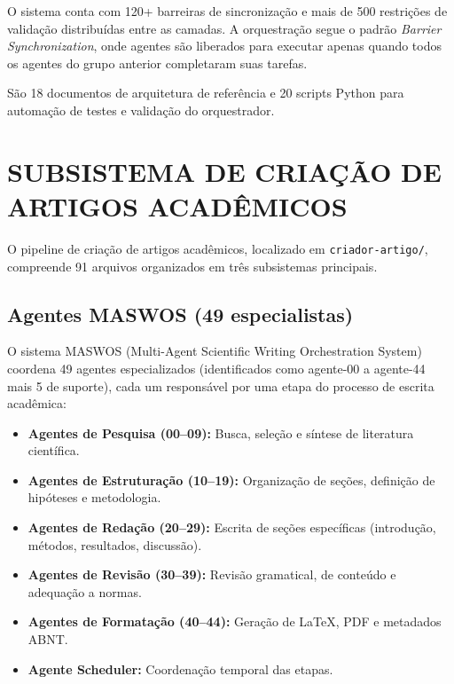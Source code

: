 \documentclass[
  brazil,
  sumario=tradicional,
  10pt
]{abntex2}
\begin{document}
O sistema conta com 120+ barreiras de sincronização e mais de 500
restrições de validação distribuídas entre as camadas. A orquestração
segue o padrão \textit{Barrier Synchronization}, onde agentes são
liberados para executar apenas quando todos os agentes do grupo
anterior completaram suas tarefas.

São 18 documentos de arquitetura de referência e 20 scripts Python
para automação de testes e validação do orquestrador.

\section{SUBSISTEMA DE CRIAÇÃO DE ARTIGOS ACADÊMICOS}
\label{sec:artigo}

O pipeline de criação de artigos acadêmicos, localizado em
\texttt{criador-artigo/}, compreende 91 arquivos organizados em
três subsistemas principais.

\subsection{Agentes MASWOS (49 especialistas)}

O sistema MASWOS (Multi-Agent Scientific Writing Orchestration System)
coordena 49 agentes especializados (identificados como agente-00 a
agente-44 mais 5 de suporte), cada um responsável por uma etapa do
processo de escrita acadêmica:

\begin{itemize}
  \item \textbf{Agentes de Pesquisa (00--09):} Busca, seleção e
    síntese de literatura científica.
  \item \textbf{Agentes de Estruturação (10--19):} Organização de
    seções, definição de hipóteses e metodologia.
  \item \textbf{Agentes de Redação (20--29):} Escrita de seções
    específicas (introdução, métodos, resultados, discussão).
  \item \textbf{Agentes de Revisão (30--39):} Revisão gramatical,
    de conteúdo e adequação a normas.
  \item \textbf{Agentes de Formatação (40--44):} Geração de LaTeX,
    PDF e metadados ABNT.
  \item \textbf{Agente Scheduler:} Coordenação temporal das etapas.
\end{itemize}
\end{document}
